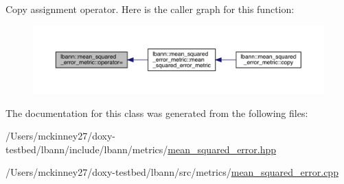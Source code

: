 Copy assignment operator. Here is the caller graph for this function\+:\nopagebreak
\begin{figure}[H]
\begin{center}
\leavevmode
\includegraphics[width=350pt]{classlbann_1_1mean__squared__error__metric_acea91914634adf15d9f4b7978ca2ff51_icgraph}
\end{center}
\end{figure}


The documentation for this class was generated from the following files\+:\begin{DoxyCompactItemize}
\item 
/\+Users/mckinney27/doxy-\/testbed/lbann/include/lbann/metrics/\hyperlink{metrics_2mean__squared__error_8hpp}{mean\+\_\+squared\+\_\+error.\+hpp}\item 
/\+Users/mckinney27/doxy-\/testbed/lbann/src/metrics/\hyperlink{metrics_2mean__squared__error_8cpp}{mean\+\_\+squared\+\_\+error.\+cpp}\end{DoxyCompactItemize}
